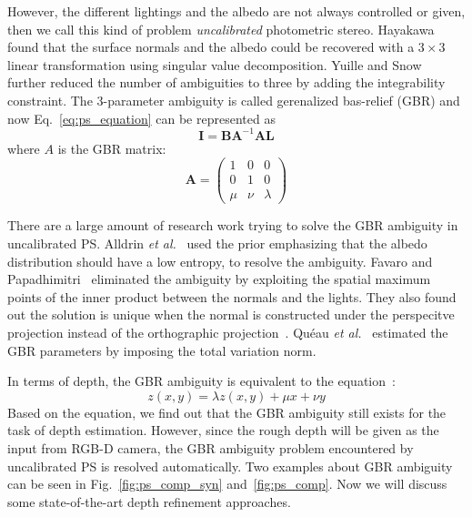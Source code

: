 However, the different lightings and the albedo are not always controlled or given, then we call this kind of problem \emph{uncalibrated} photometric stereo. 
Hayakawa~\cite{hayakawa1994photometric} found that the surface normals and the albedo could be recovered with a $3\times3$ linear transformation using singular value decomposition. Yuille and Snow~\cite{yuille1997shape} further reduced the number of ambiguities to three by adding the integrability constraint.
The 3-parameter ambiguity is called gerenalized bas-relief (GBR) and now Eq.~\ref{eq:ps_equation} can be represented as
\begin{equation}\label{eq:ps_gbr}
    \mathbf{I} = \mathbf{B}\mathbf{A}^{-1}\mathbf{A}\mathbf{L}    
\end{equation}
where $A$ is the GBR matrix:
\begin{equation}
    \mathbf{A} = 
    \begin{pmatrix}
        1& 0 & 0\\
        0& 1 & 0\\
        \mu & \nu & \lambda
    \end{pmatrix}
\end{equation}

There are a large amount of research work trying to solve the GBR ambiguity in uncalibrated PS.
Alldrin \emph{et al.}~\cite{alldrin2007resolving} used the prior emphasizing that the albedo distribution should have a low entropy, to resolve the ambiguity.
Favaro and Papadhimitri~\cite{papadhimitri2014closed} eliminated the ambiguity by exploiting the spatial maximum points of the inner product between the normals and the lights.
They also found out the solution is unique when the normal is constructed under the perspecitve projection instead of the orthographic projection~\cite{papadhimitri2013new}.
Qu\'{e}au \emph{et al.}~\cite{queau2015solving} estimated the GBR parameters by imposing the total variation norm.

In terms of depth, the GBR ambiguity is equivalent to the equation~\cite{queau2015solving}:
\begin{equation}
    z(x,y) = \lambda z(x,y) + \mu x + \nu y
\end{equation}
Based on the equation, we find out that the GBR ambiguity still exists for the task of depth estimation.
However, since the rough depth will be given as the input from RGB-D camera, the GBR ambiguity problem encountered by uncalibrated PS is resolved automatically.  
Two examples about GBR ambiguity can be seen in Fig.~\ref{fig:ps_comp_syn} and~\ref{fig:ps_comp}.
Now we will discuss some state-of-the-art depth refinement approaches.

